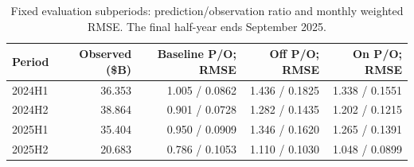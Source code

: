 \begin{table}[H]
\centering\small
\caption{Fixed evaluation subperiods: prediction/observation ratio and monthly weighted RMSE. The final half-year ends September 2025.}
\label{tab:validperiods}
\begin{tabular}{@{}lrrrr@{}}\toprule
Period & Observed (\$B) & Baseline P/O; RMSE & Off P/O; RMSE & On P/O; RMSE\\\midrule
2024H1 & 36.353 & 1.005 / 0.0862 & 1.436 / 0.1825 & 1.338 / 0.1551\\
2024H2 & 38.864 & 0.901 / 0.0728 & 1.282 / 0.1435 & 1.202 / 0.1215\\
2025H1 & 35.404 & 0.950 / 0.0909 & 1.346 / 0.1620 & 1.265 / 0.1391\\
2025H2 & 20.683 & 0.786 / 0.1053 & 1.110 / 0.1030 & 1.048 / 0.0899\\
\bottomrule
\end{tabular}
\end{table}

